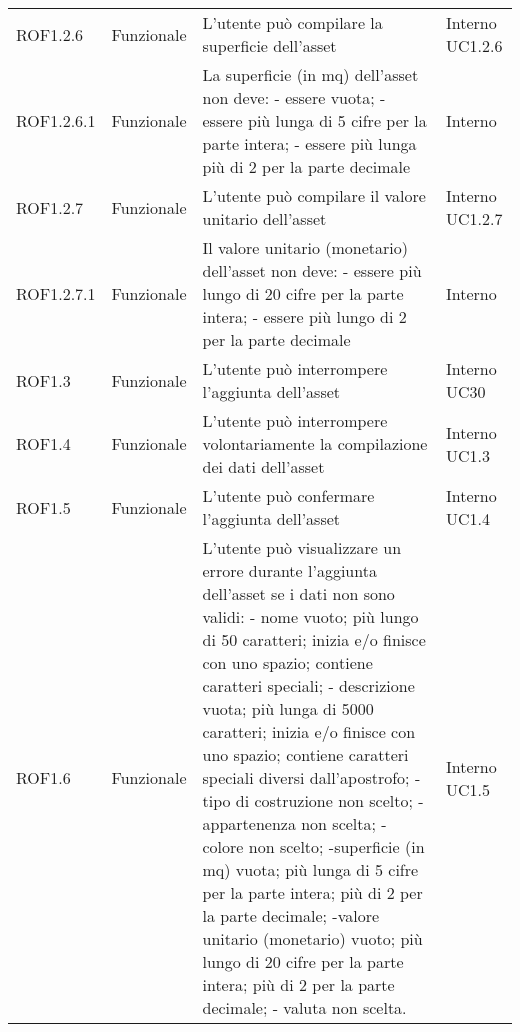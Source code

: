 \begin{longtable}{p{2cm}!{\VRule[1pt]}p{2cm}!{\VRule[1pt]}p{5cm}!{\VRule[1pt]}p{1.5cm}}
	ROF1.2.6                         & Funzionale\newline               & L'utente può compilare la superficie dell'asset                                                                          & Interno \newline UC1.2.6     
	\\
	ROF1.2.6.1&Funzionale\newline  & La superficie (in mq) dell'asset non deve:
	- essere vuota;
	- essere più lunga di 5 cifre per la parte intera;
	- essere più lunga  più di 2 per la parte decimale & Interno \\
	ROF1.2.7                         & Funzionale\newline               & L'utente può compilare il valore unitario dell'asset                                                                     & Interno \newline UC1.2.7     
	\\
	ROF1.2.7.1&Funzionale\newline  & Il valore unitario (monetario) dell'asset non deve:
	- essere più lungo di 20 cifre per la parte intera;
	- essere più lungo di 2 per la parte decimale & Interno \\
	ROF1.3                           & Funzionale\newline               & L'utente può interrompere l'aggiunta dell'asset                                                                          & Interno \newline UC30        
	\\
	ROF1.4                           & Funzionale\newline               & L'utente può interrompere volontariamente la compilazione dei dati dell'asset                                            & Interno \newline UC1.3       
	\\
	ROF1.5                           & Funzionale\newline               & L'utente può confermare l'aggiunta dell'asset                                                                            & Interno \newline UC1.4       
	\\
	ROF1.6&Funzionale\newline  & L'utente può visualizzare un errore durante l'aggiunta dell'asset se i dati non sono validi:
	- nome vuoto; più lungo di 50 caratteri; inizia e/o finisce con uno spazio; contiene caratteri speciali;
	- descrizione vuota; più lunga di 5000 caratteri; inizia e/o finisce con uno spazio; contiene caratteri speciali diversi dall'apostrofo;
	- tipo di costruzione non scelto;
	- appartenenza non scelta;
	- colore non scelto;
	-superficie (in mq) vuota; più lunga di 5 cifre per la parte intera; più di 2 per la parte decimale;
	-valore unitario (monetario) vuoto; più lungo di 20 cifre per la parte intera; più di 2 per la parte decimale;
	- valuta non scelta.
	& Interno \newline UC1.5
	\\


\end{longtable}
